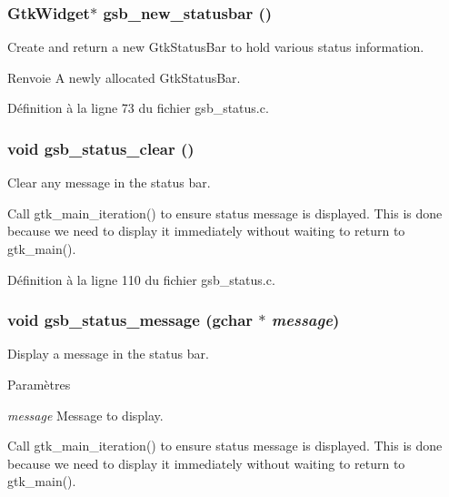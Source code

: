 \subsubsection[{gsb\_\-new\_\-statusbar}]{\setlength{\rightskip}{0pt plus 5cm}GtkWidget$\ast$ gsb\_\-new\_\-statusbar ()}\label{gsb__status_8c_afefc29293b2b4910c410f379629d4086}
Create and return a new GtkStatusBar to hold various status information.

\begin{DoxyReturn}{Renvoie}
A newly allocated GtkStatusBar. 
\end{DoxyReturn}


Définition à la ligne 73 du fichier gsb\_\-status.c.

\subsubsection[{gsb\_\-status\_\-clear}]{\setlength{\rightskip}{0pt plus 5cm}void gsb\_\-status\_\-clear ()}\label{gsb__status_8c_ae0a64a6da0c88a30c75e64e06c734aec}
Clear any message in the status bar. 

Call gtk\_\-main\_\-iteration() to ensure status message is displayed. This is done because we need to display it immediately without waiting to return to gtk\_\-main(). 



Définition à la ligne 110 du fichier gsb\_\-status.c.

\subsubsection[{gsb\_\-status\_\-message}]{\setlength{\rightskip}{0pt plus 5cm}void gsb\_\-status\_\-message (gchar $\ast$ {\em message})}\label{gsb__status_8c_a476044d7002fa33e44709e7293974914}
Display a message in the status bar.


\begin{DoxyParams}{Paramètres}
\item[{\em message}]Message to display. \end{DoxyParams}


Call gtk\_\-main\_\-iteration() to ensure status message is displayed. This is done because we need to display it immediately without waiting to return to gtk\_\-main(). 



